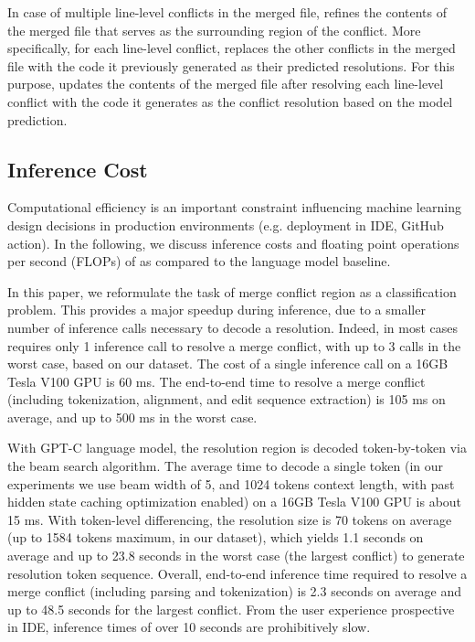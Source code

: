 In case of multiple line-level conflicts in the merged file, \thistool{} refines the contents of the merged file that serves as the surrounding region of the conflict. More specifically, for each line-level conflict, \thistool{} replaces the other conflicts in the merged file with the code it previously generated as their predicted resolutions. For this purpose, \thistool{} updates the contents of the merged file after resolving each line-level conflict with the code it generates as the conflict resolution based on the model prediction.

\iffalse
\subsection{Inference Cost}
\label{sec:inference}

Computational efficiency is an important constraint influencing machine learning design decisions in production environments (e.g. deployment in IDE, GitHub action). In the following, we discuss inference costs and floating point operations per second (FLOPs) of \thistool{} as compared to the language model baseline. 

In this paper, we reformulate the task of merge conflict region as a classification problem. This provides a major speedup during inference, due to a smaller number of inference calls necessary to decode a resolution. Indeed, in most cases \thistool{} requires only 1 inference call to resolve a merge conflict, with up to 3 calls in the worst case, based on our dataset. The cost of a single inference call on a 16GB Tesla V100 GPU is 60 ms. The end-to-end time to resolve a merge conflict (including tokenization, alignment, and edit sequence extraction) is 105 ms on average, and up to 500 ms in the worst case.

With GPT-C language model, the resolution region is decoded token-by-token via the beam search algorithm. The average time to decode a single token (in our experiments we use beam width of 5, and 1024 tokens context length, with past hidden state caching optimization enabled) on a 16GB Tesla V100 GPU is about 15 ms. With token-level differencing, the resolution size is 70 tokens on average (up to 1584 tokens maximum, in our dataset), which yields 1.1 seconds on average and up to 23.8 seconds in the worst case (the largest conflict) to generate resolution token sequence. Overall, end-to-end inference time required to resolve a merge conflict (including parsing and tokenization) is 2.3 seconds on average and up to 48.5 seconds for the largest conflict. 
From the user experience prospective in IDE, inference times of over 10 seconds are prohibitively slow.

